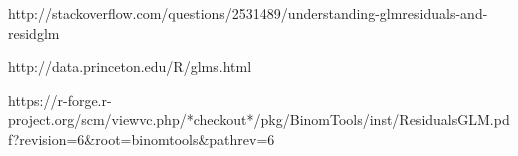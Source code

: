 http://stackoverflow.com/questions/2531489/understanding-glmresiduals-and-residglm

http://data.princeton.edu/R/glms.html

https://r-forge.r-project.org/scm/viewvc.php/*checkout*/pkg/BinomTools/inst/ResidualsGLM.pdf?revision=6&root=binomtools&pathrev=6
